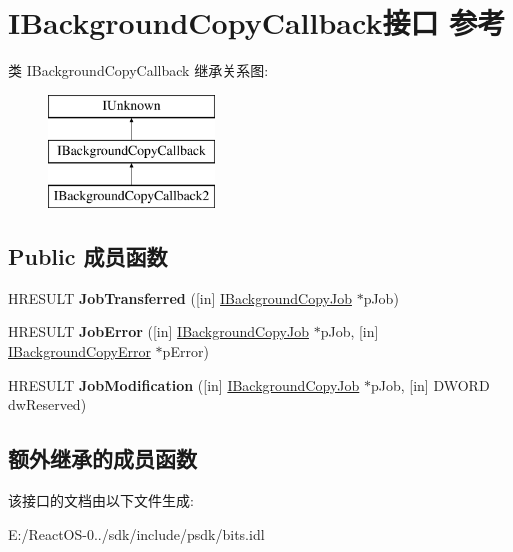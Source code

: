 \hypertarget{interface_i_background_copy_callback}{}\section{I\+Background\+Copy\+Callback接口 参考}
\label{interface_i_background_copy_callback}
类 I\+Background\+Copy\+Callback 继承关系图\+:\begin{figure}[H]
\begin{center}
\leavevmode
\includegraphics[height=3.000000cm]{interface_i_background_copy_callback}
\end{center}
\end{figure}
\subsection*{Public 成员函数}
\begin{DoxyCompactItemize}
\item 
\mbox{\label{interface_i_background_copy_callback_a313aa4cb6476125698275fe0c1e14ced}} 
H\+R\+E\+S\+U\+LT {\bfseries Job\+Transferred} (\mbox{[}in\mbox{]} \hyperlink{interface_i_background_copy_job}{I\+Background\+Copy\+Job} $\ast$p\+Job)
\item 
\mbox{\label{interface_i_background_copy_callback_a2e6d0bfd21228bcfcf89f06e5232fb05}} 
H\+R\+E\+S\+U\+LT {\bfseries Job\+Error} (\mbox{[}in\mbox{]} \hyperlink{interface_i_background_copy_job}{I\+Background\+Copy\+Job} $\ast$p\+Job, \mbox{[}in\mbox{]} \hyperlink{interface_i_background_copy_error}{I\+Background\+Copy\+Error} $\ast$p\+Error)
\item 
\mbox{\label{interface_i_background_copy_callback_ab0c366afbaeb4f3720a45cff3ef48a2f}} 
H\+R\+E\+S\+U\+LT {\bfseries Job\+Modification} (\mbox{[}in\mbox{]} \hyperlink{interface_i_background_copy_job}{I\+Background\+Copy\+Job} $\ast$p\+Job, \mbox{[}in\mbox{]} D\+W\+O\+RD dw\+Reserved)
\end{DoxyCompactItemize}
\subsection*{额外继承的成员函数}


该接口的文档由以下文件生成\+:\begin{DoxyCompactItemize}
\item 
E\+:/\+React\+O\+S-\/0../sdk/include/psdk/bits.\+idl\end{DoxyCompactItemize}

